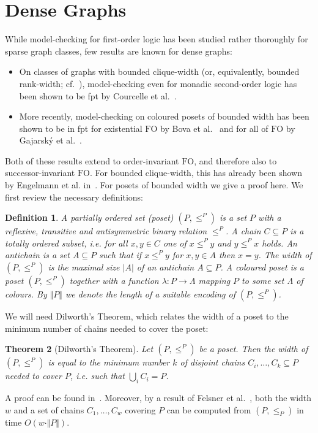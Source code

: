 \documentclass[12pt]{amsart}
\newtheorem{theorem}{Theorem}[section]
\newtheorem{definition}[theorem]{Definition}
\newcommand{\FO}{\textrm{FO}}
\begin{document}
\section{Dense Graphs}
\label{sec:dense}

While model-checking for first-order logic has been studied rather
thoroughly for sparse graph classes, few results are known for dense
graphs:
\begin{itemize}
\item On classes of graphs with bounded clique-width (or,
  equivalently, bounded rank-width; cf.~\cite{OumSey06}),
  model-checking even for monadic second-order logic has been shown to
  be fpt by Courcelle et al.~\cite{CourcelleMakRot00}.
\item More recently, model-checking on coloured posets of bounded
  width has been shown to be in fpt for existential $\FO$ by Bova et
  al.~\cite{bova2015model} and for all of $\FO$ by Gajarský et
  al.~\cite{gajarsky2015fo}.
\end{itemize}

Both of these results extend to order-invariant $\FO$, and therefore
also to successor-invariant $\FO$. For bounded clique-width, this has
already been shown by Engelmann et
al. in~\cite[Thm.~4.2]{EngelmannKS12}. For posets of bounded width we
give a proof here. We first review the necessary definitions:
\begin{definition}
  A \emph{partially ordered set (poset)} $(P,\leq^P)$ is a set $P$
  with a reflexive, transitive and antisymmetric binary relation
  $\leq^P$. A \emph{chain} $C \subseteq P$ is a totally ordered
  subset, i.e. for all $x, y \in C$ one of $x \leq^P y$ and $y \leq^P
  x$ holds. An \emph{antichain} is a set $A \subseteq P$ such that if
  $x \leq^P y$ for $x,y \in A$ then $x = y$. The \emph{width} of
  $(P,\leq^P)$ is the maximal size $|A|$ of an antichain $A \subseteq
  P$. A \emph{coloured} poset is a poset $(P,\leq^P)$ together with a
  function $\lambda : P \to \Lambda$ mapping $P$ to some set $\Lambda$
  of \emph{colours}. By $\Vert P\Vert$ we denote the length of a
  suitable encoding of $(P,\leq^P)$.
\end{definition}
We will need Dilworth's Theorem, which relates the width of a poset to
the minimum number of chains needed to cover the poset:
\begin{theorem}[Dilworth's Theorem]
  Let $(P,\leq^P)$ be a poset. Then the width of $(P,\leq^P)$ is equal
  to the minimum number $k$ of disjoint chains $C_i,\ldots,C_k
  \subseteq P$ needed to cover $P$, i.e. such that $\bigcup_i C_i =
  P$.
\end{theorem}
A proof can be found in~\cite[Sec.~2.5]{diestel}. Moreover, by a
result of Felsner et al.~\cite{felsner2003recognition}, both the width
$w$ and a set of chains $C_1,\ldots,C_w$ covering $P$ can be computed
from $(P,\leq_P)$ in time $O(w\cdot \Vert P \Vert)$.
\end{document}
